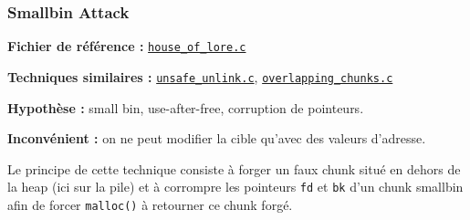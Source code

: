 \subsubsection{Smallbin Attack}

\noindent\textbf{Fichier de référence :}
\href{https://github.com/shellphish/how2heap/blob/master/glibc_2.41/house_of_lore.c}{\texttt{house\_of\_lore.c}}

\noindent\textbf{Techniques similaires :}
\href{https://github.com/shellphish/how2heap/blob/master/glibc_2.41/unsafe_unlink.c}{\texttt{unsafe\_unlink.c}},
\href{https://github.com/shellphish/how2heap/blob/master/glibc_2.41/overlapping_chunks.c}{\texttt{overlapping\_chunks.c}}

\noindent\textbf{Hypothèse :} small bin, use-after-free, corruption de pointeurs.

\noindent\textbf{Inconvénient :} on ne peut modifier la cible qu’avec des valeurs d’adresse.

Le principe de cette technique consiste à forger un faux chunk situé en dehors de la heap
(ici sur la pile) et à corrompre les pointeurs \texttt{fd} et \texttt{bk} d’un chunk
smallbin afin de forcer \texttt{malloc()} à retourner ce chunk forgé.



